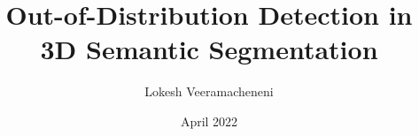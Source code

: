 \documentclass[thesis]{mas_report}
\author{Lokesh Veeramacheneni}
\title{Out-of-Distribution Detection in 3D Semantic Segmentation}
\date{April 2022}
\begin{document}
\frontmatter

\begin{titlepage}
    \maketitle
\end{titlepage}

\cleardoublepage
{}

\pagestyle{plain}
\cleardoublepage
\statementpage




\tableofcontents
\listoffigures
\listoftables

\mainmatter %

\pagestyle{mainmatter}


% 







\begin{appendices}
    
\end{appendices}

\backmatter

\end{document}
